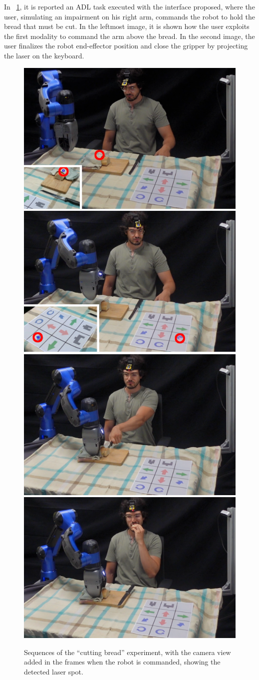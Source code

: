 In \figurename~\ref{fig:pane3-frames}, it is reported an ADL task executed with the interface proposed, where the user, simulating an impairment on his right arm, commands the robot to hold the bread that must be cut.
In the leftmost image, it is shown how the user exploits the first modality to command the arm above the bread. In the second image, the user finalizes the robot end-effector position and close the gripper by projecting the laser on the keyboard.

\begin{figure}[H]
	\centering
 	\includegraphics[width=0.22\linewidth]{img/pane-frame0edited.png}
	\includegraphics[width=0.22\linewidth]{img/pane-frame1edited.png}
	\includegraphics[width=0.22\linewidth]{img/pane-frame2edited.png}
	\includegraphics[width=0.22\linewidth]{img/pane-frame3edited.png}
	\caption{Sequences of the \enquote{cutting bread} experiment, with the camera view added in the frames when the robot is commanded, showing the detected laser spot.}
	\label{fig:pane3-frames}
\end{figure}

